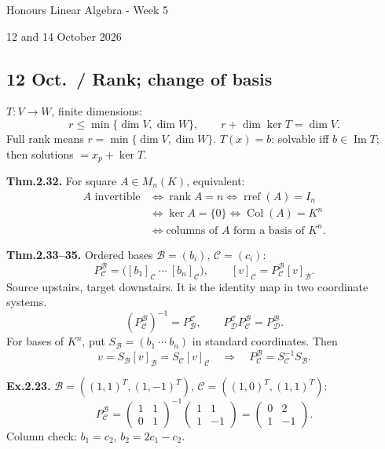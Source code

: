 \documentclass[11pt,letterpaper]{article}
\begin{document}
\begin{center}
{\LARGE Honours Linear Algebra - Week 5\par}
\vspace{5pt}
{\large 12 and 14 October 2026\par}
\end{center}
\vspace{4pt}
\subsection{12 Oct.~/ Rank; change of
basis}\label{oct.-rank-change-of-basis}

\(T:V\to W\), finite dimensions: \[
r\le\min\{\dim V,\dim W\},\qquad
r+\dim\ker T=\dim V.
\] Full rank means \(r=\min\{\dim V,\dim W\}\). \(T(x)=b\): solvable iff
\(b\in\operatorname{Im}T\); then solutions \(=x_p+\ker T\).

\textbf{Thm.2.32.} For square \(A\in M_n(K)\), equivalent: \[
\begin{aligned}
A\text{ invertible}&\iff\operatorname{rank}A=n\iff\operatorname{rref}(A)=I_n\\
&\iff\ker A=\{0\}\iff\operatorname{Col}(A)=K^n\\
&\iff\text{columns of }A\text{ form a basis of }K^n.
\end{aligned}
\]

\textbf{Thm.2.33--35.} Ordered bases \(\mathcal B=(b_i)\),
\(\mathcal C=(c_i)\): \[
P^{\mathcal B}_{\mathcal C}
=\bigl([b_1]_{\mathcal C}\ \cdots\ [b_n]_{\mathcal C}\bigr),
\qquad [v]_{\mathcal C}=P^{\mathcal B}_{\mathcal C}[v]_{\mathcal B}.
\] Source upstairs, target downstairs. It is the identity map in two
coordinate systems. \[
\left(P^{\mathcal B}_{\mathcal C}\right)^{-1}=P^{\mathcal C}_{\mathcal B},\qquad
P^{\mathcal C}_{\mathcal D}P^{\mathcal B}_{\mathcal C}=P^{\mathcal B}_{\mathcal D}.
\] For bases of \(K^n\), put \(S_{\mathcal B}=(b_1\ \cdots\ b_n)\) in
standard coordinates. Then \[
v=S_{\mathcal B}[v]_{\mathcal B}=S_{\mathcal C}[v]_{\mathcal C}
\quad\Rightarrow\quad P^{\mathcal B}_{\mathcal C}=S_{\mathcal C}^{-1}S_{\mathcal B}.
\]

\textbf{Ex.2.23.} \(\mathcal B=((1,1)^T,(1,-1)^T)\),
\(\mathcal C=((1,0)^T,(1,1)^T)\): \[
P^{\mathcal B}_{\mathcal C}
=\begin{pmatrix}1&1\\0&1\end{pmatrix}^{-1}
\begin{pmatrix}1&1\\1&-1\end{pmatrix}
=\begin{pmatrix}0&2\\1&-1\end{pmatrix}.
\] Column check: \(b_1=c_2\), \(b_2=2c_1-c_2\).
\end{document}
